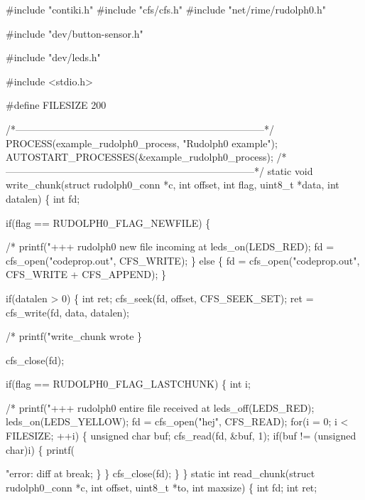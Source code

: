 \begin{DoxyCodeInclude}
\textcolor{preprocessor}{#include "contiki.h"}
\textcolor{preprocessor}{#include "cfs/cfs.h"}
\textcolor{preprocessor}{#include "net/rime/rudolph0.h"}

\textcolor{preprocessor}{#include "dev/button-sensor.h"}

\textcolor{preprocessor}{#include "dev/leds.h"}

\textcolor{preprocessor}{#include <stdio.h>}

\textcolor{preprocessor}{#define FILESIZE 200}

\textcolor{comment}{/*---------------------------------------------------------------------------*/}
PROCESS(example\_rudolph0\_process, \textcolor{stringliteral}{"Rudolph0 example"});
AUTOSTART\_PROCESSES(&example\_rudolph0\_process);
\textcolor{comment}{/*---------------------------------------------------------------------------*/}
\textcolor{keyword}{static} \textcolor{keywordtype}{void}
write\_chunk(\textcolor{keyword}{struct} rudolph0\_conn *c, \textcolor{keywordtype}{int} offset, \textcolor{keywordtype}{int} flag,
            uint8\_t *data, \textcolor{keywordtype}{int} datalen)
\{
  \textcolor{keywordtype}{int} fd;
  
  \textcolor{keywordflow}{if}(flag == RUDOLPH0\_FLAG\_NEWFILE) \{
    \textcolor{comment}{/*    printf("+++ rudolph0 new file incoming at %
    leds\_on(LEDS\_RED);
    fd = cfs\_open(\textcolor{stringliteral}{"codeprop.out"}, CFS\_WRITE);
  \} \textcolor{keywordflow}{else} \{
    fd = cfs\_open(\textcolor{stringliteral}{"codeprop.out"}, CFS\_WRITE + CFS\_APPEND);
  \}
  
  \textcolor{keywordflow}{if}(datalen > 0) \{
    \textcolor{keywordtype}{int} ret;
    cfs\_seek(fd, offset, CFS\_SEEK\_SET);
    ret = cfs\_write(fd, data, datalen);
    \textcolor{comment}{/*    printf("write\_chunk wrote %
  \}

  cfs\_close(fd);

  \textcolor{keywordflow}{if}(flag == RUDOLPH0\_FLAG\_LASTCHUNK) \{
    \textcolor{keywordtype}{int} i;
    \textcolor{comment}{/*    printf("+++ rudolph0 entire file received at %
    leds\_off(LEDS\_RED);
    leds\_on(LEDS\_YELLOW);
    fd = cfs\_open(\textcolor{stringliteral}{"hej"}, CFS\_READ);
    \textcolor{keywordflow}{for}(i = 0; i < FILESIZE; ++i) \{
      \textcolor{keywordtype}{unsigned} \textcolor{keywordtype}{char} buf;
      cfs\_read(fd, &buf, 1);
      \textcolor{keywordflow}{if}(buf != (\textcolor{keywordtype}{unsigned} \textcolor{keywordtype}{char})i) \{
        printf(\textcolor{stringliteral}{"error: diff at %
        \textcolor{keywordflow}{break};
      \}
    \}
    cfs\_close(fd);
  \}
\}
\textcolor{keyword}{static} \textcolor{keywordtype}{int}
read\_chunk(\textcolor{keyword}{struct} rudolph0\_conn *c, \textcolor{keywordtype}{int} offset, uint8\_t *to, \textcolor{keywordtype}{int} maxsize)
\{
  \textcolor{keywordtype}{int} fd;
  \textcolor{keywordtype}{int} ret;
  
}}}}
\end{DoxyCodeInclude}
